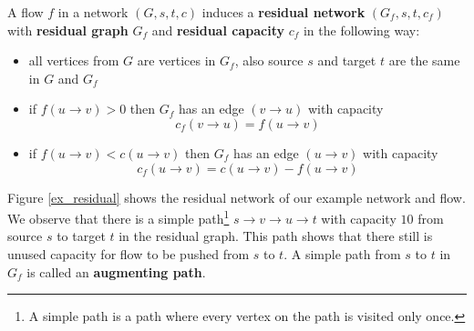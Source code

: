 \begin{defn}\label{residualgraph}
A flow $f$ in a network $(G, s, t, c)$ induces a \textbf{residual network} $(G_f, s, t, c_f)$ with \textbf{residual graph} $G_f$ and \textbf{residual capacity} $c_f$ in the following way:

\begin{itemize}
	\item all vertices from $G$ are vertices in $G_f$, also source $s$ and target $t$ are the same in $G$ and $G_f$
	\item if $f(u \rightarrow v) > 0$ then $G_f$ has an edge $(v \rightarrow u)$ with capacity 
$$
c_f(v \rightarrow u) = f(u \rightarrow v)
$$
    \item if $f(u \rightarrow v) < c(u \rightarrow v)$ then $G_f$ has an edge $(u \rightarrow v)$ with capacity
$$
c_f(u \rightarrow v) = c(u \rightarrow v) - f(u \rightarrow v)
$$
\end{itemize}

\end{defn}

Figure \ref{ex_residual} shows the residual network of our example network and flow. We observe that there is a simple path\footnote{A simple path is a path where every vertex on the path is visited only once.} $s \rightarrow v \rightarrow u \rightarrow t$ with capacity $10$ from source $s$ to target $t$ in the residual graph. This path shows that there still is unused capacity for flow to be pushed from $s$ to $t$. A simple path from $s$ to $t$ in $G_f$ is called an \textbf{augmenting path}.

